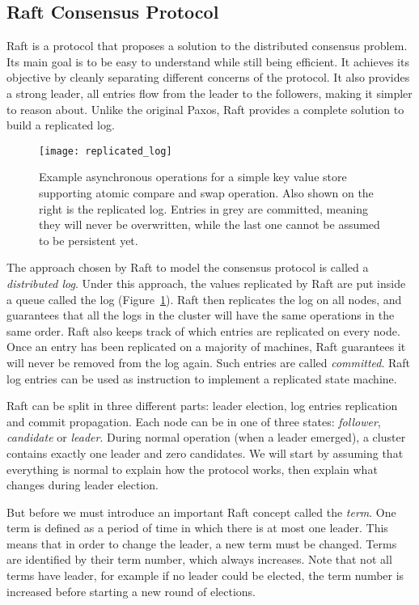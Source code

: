 \subsection{Raft Consensus Protocol}

Raft\cite{raft} is a protocol that proposes a solution to the distributed consensus problem.
Its main goal is to be easy to understand while still being efficient.
It achieves its objective by cleanly separating different concerns of the protocol.
It also provides a strong leader, \ie all entries flow from the leader to the followers, making it simpler to reason about.
Unlike the original Paxos, Raft provides a complete solution to build a replicated log.


\begin{figure}[h]
    \centering
    \texttt{[image: replicated\_log]}
    \caption{Example asynchronous operations for a simple key value store supporting atomic compare and swap operation.
        Also shown on the right is the replicated log.
        Entries in grey are committed, meaning they will never be overwritten, while the last one cannot be assumed to be persistent yet.
    \label{fig:replicated-log}
    }
\end{figure}

The approach chosen by Raft to model the consensus protocol is called a \emph{distributed log}.
Under this approach, the values replicated by Raft are put inside a queue called the log (Figure~\ref{fig:replicated-log}).
Raft then replicates the log on all nodes, and guarantees that all the logs in the cluster will have the same operations in the same order.
Raft also keeps track of which entries are replicated on every node.
Once an entry has been replicated on a majority of machines, Raft guarantees it will never be removed from the log again.
Such entries are called \emph{committed}.
Raft log entries can be used as instruction to implement a replicated state machine.

Raft can be split in three different parts: leader election, log entries replication and commit propagation.
Each node can be in one of three states: \emph{follower}, \emph{candidate} or \emph{leader}.
During normal operation (when a leader emerged), a cluster contains exactly one leader and zero candidates.
We will start by assuming that everything is normal to explain how the protocol works, then explain what changes during leader election.

But before we must introduce an important Raft concept called the \emph{term}.
One term is defined as a period of time in which there is at most one leader.
This means that in order to change the leader, a new term must be changed.
Terms are identified by their term number, which always increases.
Note that not all terms have leader, for example if no leader could be elected, the term number is increased before starting a new round of elections.

